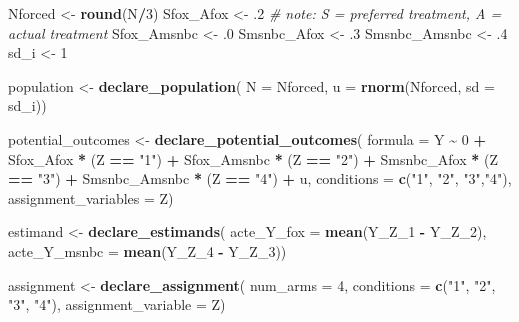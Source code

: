 \documentclass[]{article}
\newenvironment{Shaded}{\begin{snugshade}}{\end{snugshade}}
\newcommand{\CommentTok}[1]{\textcolor[rgb]{0.56,0.35,0.01}{\textit{#1}}}
\newcommand{\DataTypeTok}[1]{\textcolor[rgb]{0.13,0.29,0.53}{#1}}
\newcommand{\DecValTok}[1]{\textcolor[rgb]{0.00,0.00,0.81}{#1}}
\newcommand{\FloatTok}[1]{\textcolor[rgb]{0.00,0.00,0.81}{#1}}
\newcommand{\KeywordTok}[1]{\textcolor[rgb]{0.13,0.29,0.53}{\textbf{#1}}}
\newcommand{\NormalTok}[1]{#1}
\newcommand{\OperatorTok}[1]{\textcolor[rgb]{0.81,0.36,0.00}{\textbf{#1}}}
\newcommand{\StringTok}[1]{\textcolor[rgb]{0.31,0.60,0.02}{#1}}
\begin{document}
\begin{Shaded}
\begin{Highlighting}[]
\NormalTok{Nforced <{-}}\StringTok{ }\KeywordTok{round}\NormalTok{(N}\OperatorTok{/}\DecValTok{3}\NormalTok{)}
\NormalTok{Sfox\_Afox <{-}}\StringTok{ }\FloatTok{.2} \CommentTok{\# note: S = preferred treatment, A = actual treatment}
\NormalTok{Sfox\_Amsnbc <{-}}\StringTok{ }\FloatTok{.0}
\NormalTok{Smsnbc\_Afox <{-}}\StringTok{ }\FloatTok{.3}
\NormalTok{Smsnbc\_Amsnbc <{-}}\StringTok{ }\FloatTok{.4}
\NormalTok{sd\_i <{-}}\StringTok{ }\DecValTok{1}

\NormalTok{population <{-}}\StringTok{ }\KeywordTok{declare\_population}\NormalTok{(}
  \DataTypeTok{N =}\NormalTok{ Nforced, }\DataTypeTok{u =} \KeywordTok{rnorm}\NormalTok{(Nforced, }\DataTypeTok{sd =}\NormalTok{ sd\_i))}

\NormalTok{potential\_outcomes <{-}}\StringTok{ }\KeywordTok{declare\_potential\_outcomes}\NormalTok{(}
  \DataTypeTok{formula =}\NormalTok{ Y }\OperatorTok{\textasciitilde{}}\StringTok{ }\DecValTok{0} \OperatorTok{+}
\StringTok{    }\NormalTok{Sfox\_Afox }\OperatorTok{*}\StringTok{ }\NormalTok{(Z }\OperatorTok{==}\StringTok{ "1"}\NormalTok{) }\OperatorTok{+}
\StringTok{    }\NormalTok{Sfox\_Amsnbc }\OperatorTok{*}\StringTok{ }\NormalTok{(Z }\OperatorTok{==}\StringTok{ "2"}\NormalTok{) }\OperatorTok{+}
\StringTok{    }\NormalTok{Smsnbc\_Afox }\OperatorTok{*}\StringTok{ }\NormalTok{(Z }\OperatorTok{==}\StringTok{ "3"}\NormalTok{) }\OperatorTok{+}
\StringTok{    }\NormalTok{Smsnbc\_Amsnbc }\OperatorTok{*}\StringTok{ }\NormalTok{(Z }\OperatorTok{==}\StringTok{ "4"}\NormalTok{) }\OperatorTok{+}\StringTok{ }\NormalTok{u,}
  \DataTypeTok{conditions =} \KeywordTok{c}\NormalTok{(}\StringTok{"1"}\NormalTok{, }\StringTok{"2"}\NormalTok{, }\StringTok{"3"}\NormalTok{,}\StringTok{"4"}\NormalTok{),}
  \DataTypeTok{assignment\_variables =}\NormalTok{ Z)}

\NormalTok{estimand <{-}}\StringTok{ }\KeywordTok{declare\_estimands}\NormalTok{(}
  \DataTypeTok{acte\_Y\_fox =} \KeywordTok{mean}\NormalTok{(Y\_Z\_}\DecValTok{1} \OperatorTok{{-}}\StringTok{ }\NormalTok{Y\_Z\_}\DecValTok{2}\NormalTok{),}
  \DataTypeTok{acte\_Y\_msnbc =} \KeywordTok{mean}\NormalTok{(Y\_Z\_}\DecValTok{4} \OperatorTok{{-}}\StringTok{ }\NormalTok{Y\_Z\_}\DecValTok{3}\NormalTok{))}

\NormalTok{assignment <{-}}\StringTok{ }\KeywordTok{declare\_assignment}\NormalTok{(}
  \DataTypeTok{num\_arms =} \DecValTok{4}\NormalTok{,}
  \DataTypeTok{conditions =} \KeywordTok{c}\NormalTok{(}\StringTok{"1"}\NormalTok{, }\StringTok{"2"}\NormalTok{, }\StringTok{"3"}\NormalTok{, }\StringTok{"4"}\NormalTok{),}
  \DataTypeTok{assignment\_variable =}\NormalTok{ Z)}


\end{Highlighting}
\end{Shaded}
\end{document}
